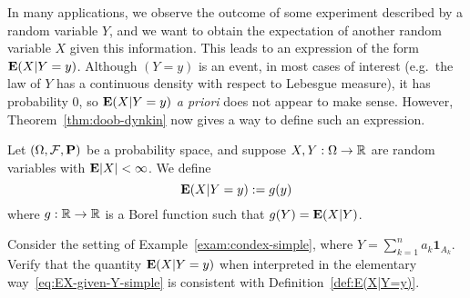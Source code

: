 In many applications, we observe the outcome of some experiment described by a random variable $Y$, and we want to obtain the expectation of another random variable $X$ given this information. This leads to an expression of the form $\mathbf{E}(X|Y=y)$. Although $(Y=y)$ is an event, in most cases of interest (e.g.\ the law of $Y$ has a continuous density with respect to Lebesgue measure), it has probability 0, so $\mathbf{E}(X|Y=y)$ \emph{a priori} does not appear to make sense. However, Theorem~\ref{thm:doob-dynkin} now gives a way to define such an expression.
\begin{definition}
\label{def:E(X|Y=y)}
    Let $(\Omega,\mathcal{F},\mathbf{P})$ be a probability space, and suppose $X,Y:\Omega\to\mathbb{R}$ are random variables with $\mathbf{E}|X|<\infty$. We define
    \begin{equation}
        \mathbf{E}(X|Y=y) := g(y)
    \end{equation}
    where $g:\mathbb{R}\to\mathbb{R}$ is a Borel function such that $g(Y)=\mathbf{E}(X|Y)$.
\end{definition}

\begin{exercise}
Consider the setting of Example~\ref{exam:condex-simple}, where $Y=\sum_{k=1}^n a_k\mathbf{1}_{A_k}$. Verify that the quantity $\mathbf{E}(X|Y=y)$ when interpreted in the elementary way~\eqref{eq:EX-given-Y-simple} is consistent with Definition~\ref{def:E(X|Y=y)}.
\end{exercise}


